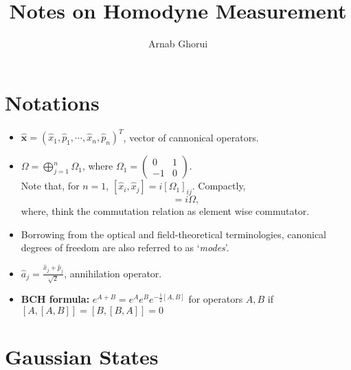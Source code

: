 \documentclass[english,10pt,a4paper]{article}
\title{Notes on Homodyne Measurement}
\author{Arnab Ghorui}
\newcommand{\xx}{\hat{\textbf{x}}}
\newcommand{\half}{\frac{1}{2}}
\begin{document}
	\maketitle
	
	\section{Notations}
	\begin{itemize}
		\item $\xx= (\hat x_1, \hat p_1,\cdots,\hat x_n, \hat p_n)^T$, vector of cannonical operators.
		\item $\Omega = \bigoplus_{j=1}^n \Omega_1$, where $\Omega_1 = \begin{pmatrix}
			0 & 1 \\ -1 & 0
		\end{pmatrix}$.\\
		Note that, for $n=1$, $[\hat x_i,\hat x_j] = i[\Omega_1]_{ij}$. Compactly, 
		\begin{equation}
			[\xx, \xx^T] = i\Omega, \tag{Canonical Commutation Relation}
		\end{equation}
		 where, think the commutation relation as element wise commutator.
		\item Borrowing from the optical and field-theoretical terminologies, canonical degrees	of freedom are also referred to as ‘\textit{modes}’.
		\item $\hat a_j = \frac{\hat x_j + \hat p_j}{\sqrt 2}$, annihilation operator.
		\item \textbf{BCH formula: }$e^{A+B}=e^A e^B e^{-\half[A,B]}$	for operators $A,B$ if $[A,[A,B]]=[B,[B,A]]=0$
	\end{itemize}
	
	\section{Gaussian States}
	
\end{document}
